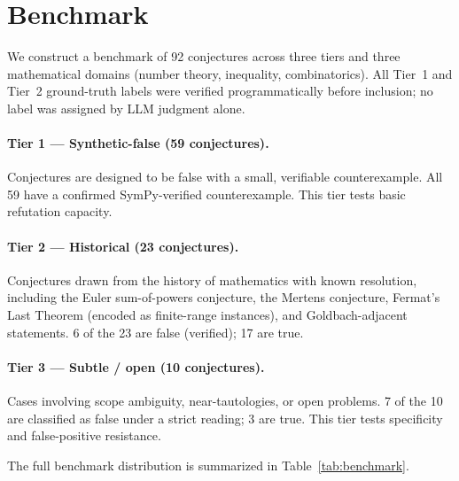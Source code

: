 \section{Benchmark}
\label{sec:benchmark}

We construct a benchmark of 92 conjectures across three tiers and three
mathematical domains (number theory, inequality, combinatorics).
All Tier~1 and Tier~2 ground-truth labels were verified programmatically
before inclusion; no label was assigned by LLM judgment alone.

\paragraph{Tier 1 — Synthetic-false (59 conjectures).}
Conjectures are designed to be false with a small, verifiable counterexample.
All 59 have a confirmed SymPy-verified counterexample.
This tier tests basic refutation capacity.

\paragraph{Tier 2 — Historical (23 conjectures).}
Conjectures drawn from the history of mathematics with known resolution,
including the Euler sum-of-powers conjecture, the Mertens conjecture,
Fermat's Last Theorem (encoded as finite-range instances), and
Goldbach-adjacent statements.
6 of the 23 are false (verified); 17 are true.

\paragraph{Tier 3 — Subtle / open (10 conjectures).}
Cases involving scope ambiguity, near-tautologies, or open problems.
7 of the 10 are classified as false under a strict reading; 3 are true.
This tier tests specificity and false-positive resistance.

\noindent
The full benchmark distribution is summarized in Table~\ref{tab:benchmark}.

\begin{table}[t]
\centering
\caption{Benchmark composition. ``False'' = conjectures with a verified
counterexample (ground-truth positive for refutation).}
\label{tab:benchmark}

\end{table}

